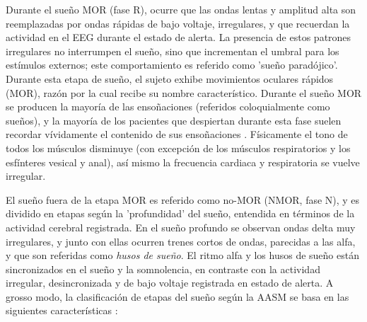 Durante el sue\~no MOR (fase R), ocurre que las ondas lentas y amplitud alta son reemplazadas por 
ondas r\'apidas de bajo voltaje, irregulares, y que recuerdan la actividad en el EEG durante el 
estado de alerta.
La presencia de estos patrones irregulares no interrumpen el sue\~no, sino que incrementan el 
umbral para los est\'imulos externos; este comportamiento es referido como 'sue\~no parad\'ojico'.
Durante esta etapa de sue\~no, el sujeto exhibe movimientos oculares r\'apidos (MOR), raz\'on por 
la cual recibe su nombre caracter\'istico.
Durante el sue\~no MOR se producen la mayor\'ia de las enso\~naciones (referidos coloquialmente 
como sue\~nos), y la mayor\'ia de los pacientes que despiertan durante esta fase suelen recordar 
v\'ividamente el contenido de sus enso\~naciones \cite{Chokroverty09}.
F\'isicamente el tono de todos los m\'usculos disminuye (con excepci\'on de los m\'usculos 
respiratorios y los esf\'interes vesical y anal), as\'i mismo la frecuencia cardiaca y respiratoria 
se vuelve irregular.

El sue\~no fuera de la etapa MOR es referido como no-MOR (NMOR, fase N), y es dividido en etapas 
seg\'un la 'profundidad' del sue\~no, entendida en t\'erminos de la actividad cerebral registrada.
En el sue\~no profundo se observan ondas delta muy irregulares, y junto con ellas ocurren trenes 
cortos de ondas, parecidas a las alfa, y que son referidas como \textit{husos de sue\~no}. 
El ritmo alfa y los husos de sue\~no est\'an sincronizados en el sue\~no y la somnolencia, en 
contraste con la actividad irregular, desincronizada y de bajo voltaje registrada en estado de 
alerta.
A grosso modo, la clasificaci\'on de etapas del sue\~no seg\'un la AASM se basa en las siguientes
caracter\'isticas \cite{Hori01}:

